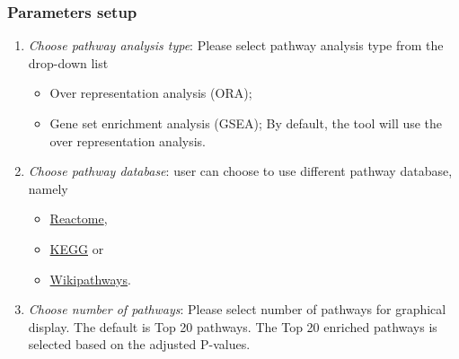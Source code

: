 \documentclass[
  a4paper,
  oneside,
  open=any]{scrreport}
\providecommand{\tightlist}{%
  \setlength{\itemsep}{0pt}\setlength{\parskip}{0pt}}\usepackage{longtable,booktabs,array}
\begin{document}
\hypertarget{parameters-setup-1}{%
\subsubsection{Parameters setup}\label{parameters-setup-1}}

\begin{enumerate}
\def\labelenumi{\arabic{enumi}.}
\tightlist
\item
  \emph{Choose pathway analysis type}: Please select pathway analysis
  type from the drop-down list

  \begin{itemize}
  \tightlist
  \item
    Over representation analysis (ORA);
  \item
    Gene set enrichment analysis (GSEA); By default, the tool will use
    the over representation analysis.
  \end{itemize}
\item
  \emph{Choose pathway database}: user can choose to use different
  pathway database, namely

  \begin{itemize}
  \tightlist
  \item
    \href{https://reactome.org/}{Reactome},
  \item
    \href{https://www.genome.jp/kegg/}{KEGG} or
  \item
    \href{https://www.wikipathways.org/}{Wikipathways}.
  \end{itemize}
\item
  \emph{Choose number of pathways}: Please select number of pathways for
  graphical display. The default is Top 20 pathways. The Top 20 enriched
  pathways is selected based on the adjusted P-values.
\end{enumerate}
\end{document}
